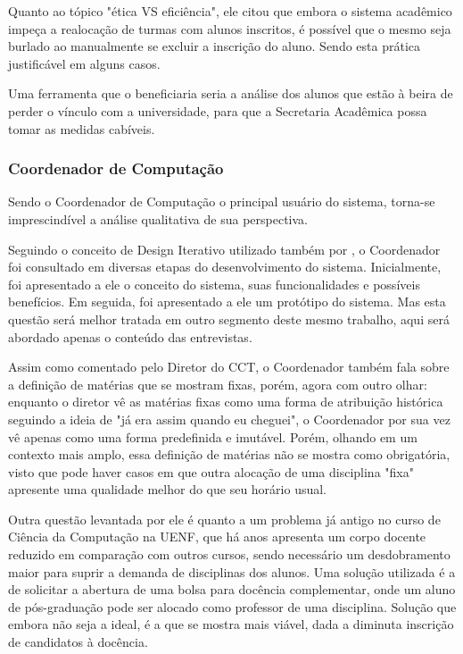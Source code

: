         Quanto ao tópico "ética VS eficiência", ele citou que embora o sistema acadêmico impeça a realocação de turmas com alunos inscritos, é possível que o mesmo seja burlado ao manualmente se excluir a inscrição do aluno. Sendo esta prática justificável em alguns casos.

        Uma ferramenta que o beneficiaria seria a análise dos alunos que estão à beira de perder o vínculo com a universidade, para que a Secretaria Acadêmica possa tomar as medidas cabíveis.

    \subsubsection{Coordenador de Computação} %

        Sendo o Coordenador de Computação o principal usuário do sistema, torna-se imprescindível a análise qualitativa de sua perspectiva.

        Seguindo o conceito de Design Iterativo utilizado também por \cite{andre_interaction_2018}, o Coordenador foi consultado em diversas etapas do desenvolvimento do sistema. Inicialmente, foi apresentado a ele o conceito do sistema, suas funcionalidades e possíveis benefícios. Em seguida, foi apresentado a ele um protótipo do sistema. Mas esta questão será melhor tratada em outro segmento deste mesmo trabalho, aqui será abordado apenas o conteúdo das entrevistas.

        Assim como comentado pelo Diretor do CCT, o Coordenador também fala sobre a definição de matérias que se mostram fixas, porém, agora com outro olhar: enquanto o diretor vê as matérias fixas como uma forma de atribuição histórica seguindo a ideia de "já era assim quando eu cheguei", o Coordenador por sua vez vê apenas como uma forma predefinida e imutável. Porém, olhando em um contexto mais amplo, essa definição de matérias não se mostra como obrigatória, visto que pode haver casos em que outra alocação de uma disciplina "fixa" apresente uma qualidade melhor do que seu horário usual.

        Outra questão levantada por ele é quanto a um problema já antigo no curso de Ciência da Computação na UENF, que há anos apresenta um corpo docente reduzido em comparação com outros cursos, sendo necessário um desdobramento maior para suprir a demanda de disciplinas dos alunos. Uma solução utilizada é a de solicitar a abertura de uma bolsa para docência complementar, onde um aluno de pós-graduação pode ser alocado como professor de uma disciplina. Solução que embora não seja a ideal, é a que se mostra mais viável, dada a diminuta inscrição de candidatos à docência.

